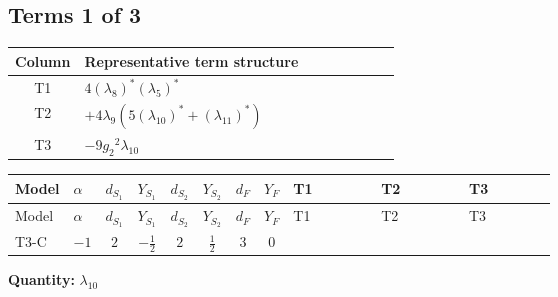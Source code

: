 \documentclass[8pt]{article}
\begin{document}
\begin{landscape}
\subsection*{Terms 1 of 3}
\begin{center}
\begin{tabular}{@{}c >{\raggedright\arraybackslash}p{0.82\linewidth}@{}}
\toprule
Column & Representative term structure \\
\midrule
T1 & \(\displaystyle 4 \left({\lambda_{8}}\right)^{*} \left({\lambda_5}\right)^{*}\) \\
\midrule
T2 & \(\displaystyle +4 {\lambda_{9}} (5 \left({\lambda_{10}}\right)^{*}+\left({\lambda_{11}}\right)^{*})\) \\
\midrule
T3 & \(\displaystyle -9 {g_2}^2 {\lambda_{10}}\) \\
\midrule
\bottomrule
\end{tabular}
\end{center}
\smallskip
\tiny
\begin{longtable}{@{}llcccccc >{\raggedright\arraybackslash}p{0.21\linewidth} >{\raggedright\arraybackslash}p{0.21\linewidth} >{\raggedright\arraybackslash}p{0.21\linewidth}@{}}
\toprule
Model & $\alpha$ & $d_{S_1}$ & $Y_{S_1}$ & $d_{S_2}$ & $Y_{S_2}$ & $d_F$ & $Y_F$ & T1 & T2 & T3 \\
\midrule
\endfirsthead
\toprule
Model & $\alpha$ & $d_{S_1}$ & $Y_{S_1}$ & $d_{S_2}$ & $Y_{S_2}$ & $d_F$ & $Y_F$ & T1 & T2 & T3 \\
\midrule
\endhead
T3-C & $-1$ & $2$ & $-\frac{1}{2}$ & $2$ & $\frac{1}{2}$ & $3$ & $0$ & \scriptsize\adjustbox{max width=\linewidth}{$\begin{gathered} 4 \left({\lambda_{8}}\right)^{*} \left({\lambda_5}\right)^{*}\end{gathered}$} & \scriptsize\adjustbox{max width=\linewidth}{$\begin{gathered} +4 {\lambda_{9}} (5 \left({\lambda_{10}}\right)^{*}+\left({\lambda_{11}}\right)^{*})\end{gathered}$} & \scriptsize\adjustbox{max width=\linewidth}{$\begin{gathered} -9 {g_2}^2 {\lambda_{10}}\end{gathered}$} \\
\midrule
\bottomrule
\end{longtable}
\clearpage
\noindent\textbf{Quantity: }$\lambda_{10}$\par\smallskip

\end{landscape}
\end{document}
